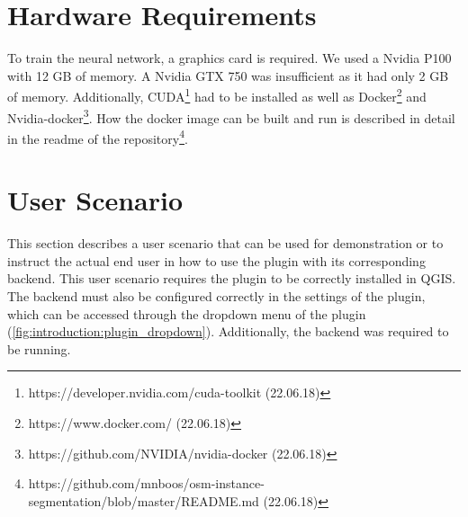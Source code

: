 \section{Hardware Requirements}
To train the neural network, a graphics card is required. We used a Nvidia P100 with 12 GB of memory. A Nvidia GTX 750 was insufficient as it had only 2 GB of memory. Additionally, CUDA\footnote{https://developer.nvidia.com/cuda-toolkit (22.06.18)} had to be installed as well as Docker\footnote{https://www.docker.com/ (22.06.18)} and Nvidia-docker\footnote{https://github.com/NVIDIA/nvidia-docker (22.06.18)}. How the docker image can be built and run is described in detail in the readme of the repository\footnote{https://github.com/mnboos/osm-instance-segmentation/blob/master/README.md (22.06.18)}.

\section{User Scenario}
This section describes a user scenario that can be used for demonstration or to instruct the actual end user in how to use the plugin with its corresponding backend. This user scenario requires the plugin to be correctly installed in QGIS. The backend must also be configured correctly in the settings of the plugin, which can be accessed through the dropdown menu of the plugin (\autoref{fig:introduction:plugin_dropdown}). Additionally, the backend was required to be running.

